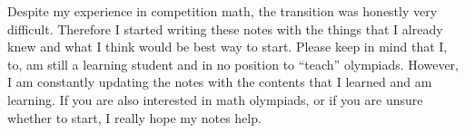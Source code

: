 \documentclass[../../main.tex]{subfiles}
\begin{document}
Despite my experience in competition math, the transition was
honestly very difficult. Therefore I started writing these notes
with the things that I already knew and what I think would be best
way to start. Please keep in mind that I, to, am still a learning
student and in no position to ``teach'' olympiads. However,
I am constantly updating the notes with the contents that I learned
and am learning. If you are also interested in math olympiads,
or if you are unsure whether to start, I really hope my notes help.
\end{document}
